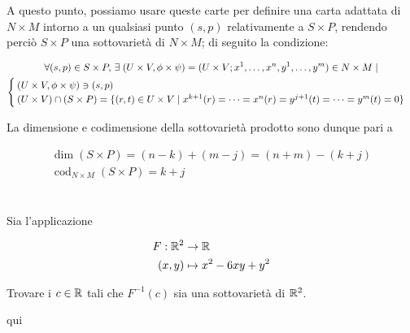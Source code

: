 A questo punto, possiamo usare queste carte per definire una carta adattata di $ N \times M $ intorno a un qualsiasi punto $ (s,p) $ relativamente a $ S \times P $, rendendo perciò $ S \times P $ una sottovarietà di $ N \times M $; di seguito la condizione:

\begin{gather}
	\forall (s,p) \in S \times P, \, \exists \; (U \times V, \phi \times \psi) = (U \times V; x^{1},\dots,x^{n}, y^{1},\dots,y^{m}) \in N \times M \mid \nonumber\\
	\begin{cases}
		(U \times V, \phi \times \psi) \ni (s,p)\\
		(U \times V) \cap (S \times P) = \{ (r,t) \in U \times V \mid x^{k+1}(r) = \dots = x^{n}(r) = y^{j+1}(t) = \dots = y^{m}(t) = 0 \}
	\end{cases}
\end{gather}

La dimensione e codimensione della sottovarietà prodotto sono dunque pari a

\begin{gather}
	\dim(S \times P) = (n - k) + (m - j) = (n + m) - (k + j)\\
	\operatorname{cod}_{N \times M}(S \times P) = k + j
\end{gather}

%

\newpage

%

\section{}\label{es2-13}

\begin{tcolorbox}
	Sia l'applicazione
	
	\begin{align}
		\begin{split}
			F : \mathbb{R}^{2} &\to \mathbb{R}\\
			(x,y) &\mapsto x^{2}-6xy+y^{2}
		\end{split}
	\end{align}
	
	Trovare i $ c \in \mathbb{R} $ tali che $ F^{-1}(c) $ sia una sottovarietà di $ \mathbb{R}^{2} $.
\end{tcolorbox}

qui

%

\newpage

%

\section{}\label{es2-14}

